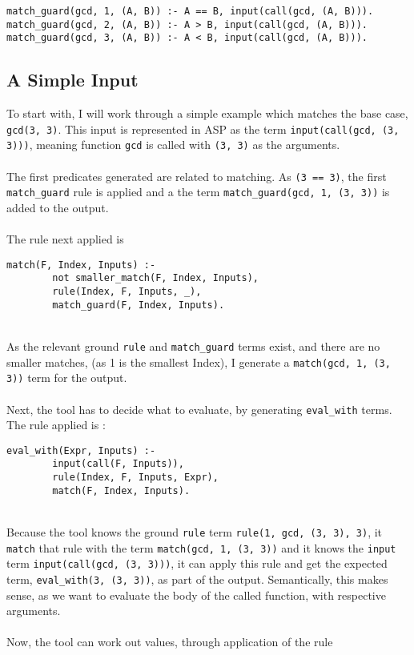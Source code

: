 \begin{lstlisting}
match_guard(gcd, 1, (A, B)) :- A == B, input(call(gcd, (A, B))).
match_guard(gcd, 2, (A, B)) :- A > B, input(call(gcd, (A, B))).
match_guard(gcd, 3, (A, B)) :- A < B, input(call(gcd, (A, B))).
\end{lstlisting}

\subsection{A Simple Input}
To start with, I will work through a simple example which matches the base case, \lstinline{gcd(3, 3)}. This input is represented in ASP as the term \lstinline{input(call(gcd, (3, 3)))}, meaning function \lstinline{gcd} is called with \lstinline{(3, 3)} as the arguments. \\ \\
The first predicates generated are related to matching. As \lstinline{(3 == 3)}, the first \lstinline{match_guard} rule is applied and a the term \lstinline{match_guard(gcd, 1, (3, 3))} is added to the output.\\ \\ %
The rule next applied is \\

\begin{lstlisting}
match(F, Index, Inputs) :- 
		not smaller_match(F, Index, Inputs), 
		rule(Index, F, Inputs, _), 
		match_guard(F, Index, Inputs).
\end{lstlisting}
\mbox{} \\
As the relevant ground \lstinline{rule} and \lstinline{match_guard} terms exist, and there are no smaller matches, (as 1 is the smallest Index), I generate a \lstinline{match(gcd, 1, (3, 3))} term for the output. \\ \\ %
Next, the tool has to decide what to evaluate, by generating \lstinline{eval_with} terms. The rule applied is :\\ %

\begin{lstlisting}
eval_with(Expr, Inputs) :- 
		input(call(F, Inputs)), 
		rule(Index, F, Inputs, Expr), 
		match(F, Index, Inputs).
\end{lstlisting}
\mbox{} \\
Because the tool knows the ground \lstinline{rule} term \lstinline{rule(1, gcd, (3, 3), 3)}, it \lstinline{match} that rule with the term \lstinline{match(gcd, 1, (3, 3))} and it knows the \lstinline{input} term \lstinline{input(call(gcd, (3, 3)))}, it can apply this rule and get the expected term, \lstinline{eval_with(3, (3, 3))}, as part of the output. Semantically, this makes sense, as we want to evaluate the body of the called function, with respective arguments. \\ \\%
Now, the tool can work out values, through application of the rule \\

